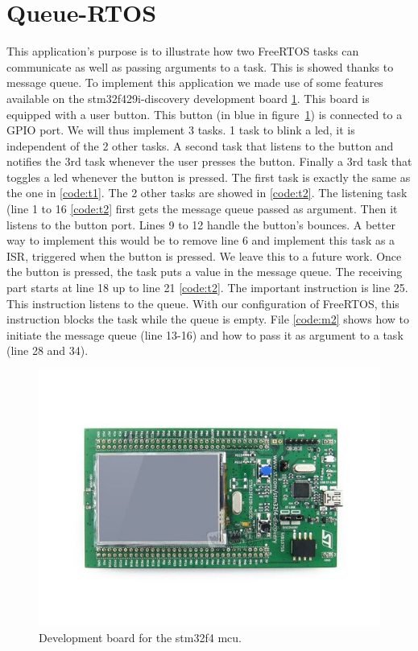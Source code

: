 \documentclass[12pt,a4paper]{report}
\begin{document}
\section{Queue-RTOS}
\label{sec:qr}
This application's purpose is to illustrate how two FreeRTOS tasks can communicate as well as passing arguments to a task. This is showed thanks to message queue. To implement this application we made use of some features available on the stm32f429i-discovery development board \ref{fig:board}. This board is equipped with a user button. This button (in blue in figure~\ref{fig:board}) is connected to a GPIO port. We will thus implement 3 tasks. 1 task to blink a led, it is independent of the 2 other tasks. A second task that listens to the button and notifies the 3rd task whenever the user presses the button. Finally a 3rd task that toggles a led whenever the button is pressed.\newline
The first task is exactly the same as the one in \ref{code:t1}. The 2 other tasks are showed in \ref{code:t2}. The listening task (line 1 to 16 \ref{code:t2} first gets the message queue passed as argument. Then it listens to the button port. Lines 9 to 12 handle the button's bounces. A better way to implement this would be to remove line 6 and implement this task as a ISR, triggered when the button is pressed. We leave this to a future work. Once the button is pressed, the task puts a value in the message queue. The receiving part starts at line 18 up to line 21 \ref{code:t2}. The important instruction is line 25. This instruction listens to the queue. With our configuration of FreeRTOS, this instruction blocks the task while the queue is empty.\newline
File \ref{code:m2} shows how to initiate the message queue (line 13-16) and how to pass it as argument to a task (line 28 and 34). 
\begin{figure}[h]
    \centering
    \includegraphics[scale=0.5]{figs/board.jpg}
    \caption{Development board for the stm32f4 mcu.}
    \label{fig:board}
\end{figure}
\end{document}
